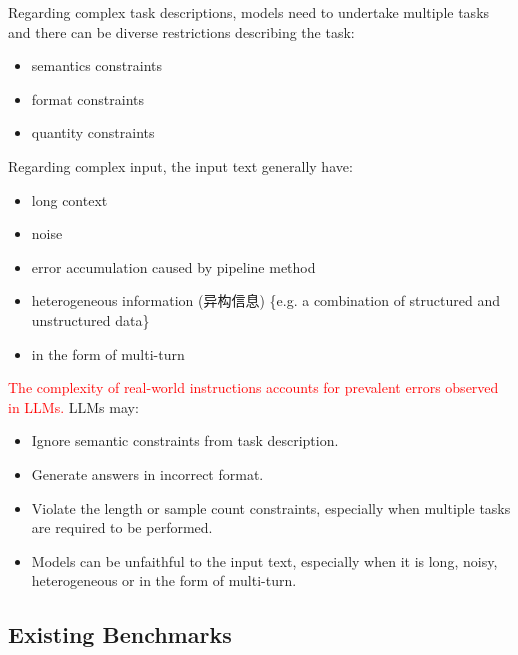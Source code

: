 \documentclass{beamer}
\begin{document}
\begin{frame}
    Regarding complex task descriptions, models need to undertake multiple tasks and there can be diverse restrictions describing the task:
    \begin{itemize}
        \item {semantics constraints}
        \item {format constraints}
        \item {quantity constraints}
    \end{itemize}
    Regarding complex input, the input text generally have:
    \begin{itemize}
        \item {long context}
        \item {noise}
        \item {error accumulation caused by pipeline method}
        \item {heterogeneous information (异构信息) \{e.g. a combination of structured and unstructured data\}}
        \item {in the form of multi-turn}
    \end{itemize}
\end{frame}

\begin{frame}
    \textcolor{red}{The complexity of real-world instructions accounts for prevalent errors observed in LLMs.}
    \newline
    LLMs may:
    \begin{itemize}
        \item {Ignore semantic constraints from task description.}
        \item {Generate answers in incorrect format.}
        \item {Violate the length or sample count constraints, especially when multiple tasks are required to be performed.}
        \item {Models can be unfaithful to the input text, especially when it is long, noisy, heterogeneous or in the form of multi-turn.}
    \end{itemize}
\end{frame}

\subsection{Existing Benchmarks}
\end{document}
